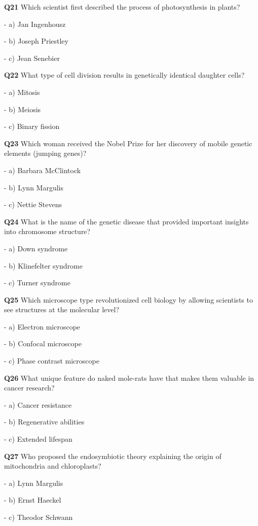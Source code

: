 \textbf{Q21} Which scientist first described the process of photosynthesis in plants?\par
\quad - a) Jan Ingenhousz\par
\quad - b) Joseph Priestley\par
\quad - c) Jean Senebier\par

\textbf{Q22} What type of cell division results in genetically identical daughter cells?\par
\quad - a) Mitosis\par
\quad - b) Meiosis\par
\quad - c) Binary fission\par

\textbf{Q23} Which woman received the Nobel Prize for her discovery of mobile genetic elements (jumping genes)?\par
\quad - a) Barbara McClintock\par
\quad - b) Lynn Margulis\par
\quad - c) Nettie Stevens\par

\textbf{Q24} What is the name of the genetic disease that provided important insights into chromosome structure?\par
\quad - a) Down syndrome\par
\quad - b) Klinefelter syndrome\par
\quad - c) Turner syndrome\par

\textbf{Q25} Which microscope type revolutionized cell biology by allowing scientists to see structures at the molecular level?\par
\quad - a) Electron microscope\par
\quad - b) Confocal microscope\par
\quad - c) Phase contrast microscope\par

\textbf{Q26} What unique feature do naked mole‑rats have that makes them valuable in cancer research?\par
\quad - a) Cancer resistance\par
\quad - b) Regenerative abilities\par
\quad - c) Extended lifespan\par

\textbf{Q27} Who proposed the endosymbiotic theory explaining the origin of mitochondria and chloroplasts?\par
\quad - a) Lynn Margulis\par
\quad - b) Ernst Haeckel\par
\quad - c) Theodor Schwann\par

